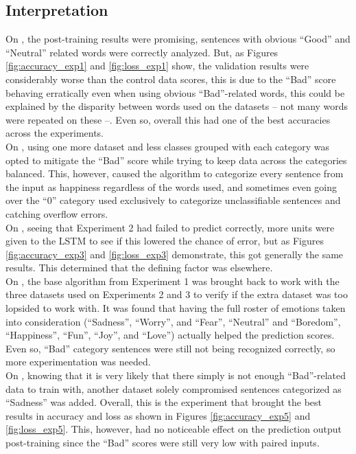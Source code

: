 \subsection{Interpretation}
On , the post-training results were promising, sentences with obvious ``Good'' and ``Neutral'' related words were correctly analyzed. But, as Figures \ref{fig:accuracy_exp1} and \ref{fig:loss_exp1} show, the validation results were considerably worse than the control data scores, this is due to the ``Bad'' score behaving erratically even when using obvious ``Bad''-related words, this could be explained by the disparity between words used on the datasets -- not many words were repeated on these --. Even so, overall this had one of the best accuracies across the experiments. \\

On , using one more dataset and less classes grouped with each category was opted to mitigate the ``Bad'' score while trying to keep data across the categories balanced. This, however, caused the algorithm to categorize every sentence from the input as happiness regardless of the words used, and sometimes even going over the ``0'' category used exclusively to categorize unclassifiable sentences and catching overflow errors. \\

On , seeing that Experiment 2 had failed to predict correctly, more units were given to the LSTM to see if this lowered the chance of error, but as Figures \ref{fig:accuracy_exp3} and \ref{fig:loss_exp3} demonstrate, this got generally the same results. This determined that the defining factor was elsewhere. \\

On , the base algorithm from Experiment 1 was brought back to work with the three datasets used on Experiments 2 and 3 to verify if the extra dataset was too lopsided to work with. It was found that having the full roster of emotions taken into consideration (``Sadness'', ``Worry'', and ``Fear'', ``Neutral'' and ``Boredom'', ``Happiness'', ``Fun'', ``Joy'', and ``Love'') actually helped the prediction scores. Even so, ``Bad'' category sentences were still not being recognized correctly, so more experimentation was needed. \\

On , knowing that it is very likely that there simply is not enough ``Bad''-related data to train with, another dataset solely compromised sentences categorized as ``Sadness'' was added. Overall, this is the experiment that brought the best results in accuracy and loss as shown in Figures \ref{fig:accuracy_exp5} and \ref{fig:loss_exp5}. This, however, had no noticeable effect on the prediction output post-training since the ``Bad'' scores were still very low with paired inputs. \\

